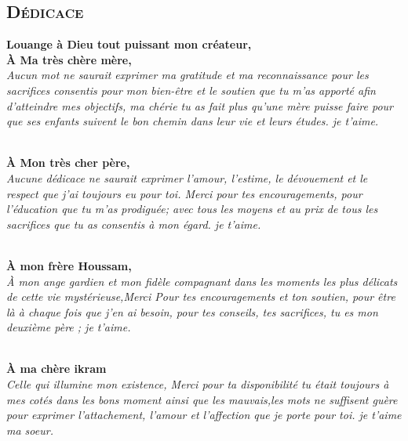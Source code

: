 \documentclass[a4paper, 12pt]{report}
\begin{document}
\begin{center}
\chapter*{\textsc{Dédicace}}
\centering
{}
\begin{center}
\textbf{Louange à Dieu tout puissant mon créateur,}\\

\textbf{À Ma très chère mère,}\\
\textit{Aucun mot ne saurait exprimer ma gratitude et ma reconnaissance pour les sacrifices consentis pour mon bien-être et le soutien que tu m'as apporté afin d'atteindre mes objectifs, ma chérie tu as fait plus qu'une mère puisse faire pour que ses 
enfants suivent le bon chemin dans leur vie et leurs études. je t'aime.}


\textbf{\\À Mon très cher père,\\}
\textit{Aucune dédicace ne saurait exprimer l'amour, l'estime, le dévouement et le respect que j'ai toujours eu pour toi. Merci pour tes encouragements, pour l'éducation que tu m'as prodiguée; avec tous les moyens et au prix de tous les sacrifices que tu as consentis à mon égard. je t'aime.}

\textbf{\\À mon frère Houssam,\\}
\textit{À mon ange gardien et mon fidèle compagnant dans les moments les plus délicats de cette vie mystérieuse,Merci Pour tes encouragements et ton soutien, pour être là à chaque fois que j'en ai besoin, pour tes conseils, tes sacrifices, tu es mon deuxième père ; je t'aime.}
 
\textbf{\\À ma chère ikram\\}
\textit{Celle qui illumine mon existence, Merci pour ta disponibilité tu était toujours à mes cotés dans les bons moment ainsi que les mauvais,les mots ne suffisent guère pour exprimer l'attachement, l'amour et  l'affection que je porte pour toi.  je t'aime ma soeur.}


\end{center}
\end{center}
\end{document}
